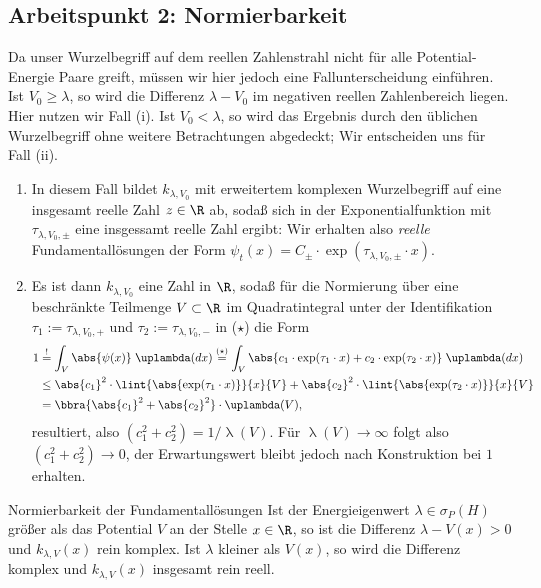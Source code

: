 \documentclass{subfiles}
\begin{document}
    \subsection{Arbeitspunkt 2: Normierbarkeit}
        Da unser Wurzelbegriff auf dem reellen Zahlenstrahl nicht für alle Potential-Energie Paare greift, müssen wir hier jedoch eine Fallunterscheidung einführen. Ist $V_0\geq \lambda$, so wird die Differenz $\lambda - V_0$ im negativen reellen Zahlenbereich liegen. Hier nutzen wir Fall (i). Ist $V_0 < \lambda$, so wird das Ergebnis durch den üblichen Wurzelbegriff ohne weitere Betrachtungen abgedeckt; Wir entscheiden uns für Fall (ii). 
        \begin{enumerate}[label=(\roman*)]
            \item In diesem Fall bildet $k_{\lambda,V_0}$ mit erweitertem komplexen Wurzelbegriff auf eine insgesamt reelle Zahl $z\in\R$ ab, sodaß sich in der Exponentialfunktion mit $\tau_{\lambda,V_0,\pm}$ eine insgessamt reelle Zahl ergibt: Wir erhalten also \emph{reelle} Fundamentallösungen der Form $\psi_t(x) = C_\pm\cdot\exp(\tau_{\lambda,V_0,\pm}\cdot x)$.
            \item Es ist dann $k_{\lambda,V_0}$ eine Zahl in $\R$, sodaß für die Normierung über eine beschränkte Teilmenge $V\subset\R$ im Quadratintegral unter der Identifikation $\tau_1 := \tau_{\lambda,V_0,+}$ und $\tau_2 := \tau_{\lambda,V_0,-}$ in ($\star$) die Form
            \begin{align*}
                1 &\stackrel{!}{=} \int_V\abs{\psi(x)}\;\uplambda(dx) \stackrel{(\star)}{=} \int_V\abs{c_1\cdot\exp(\tau_1\cdot x) + c_2\cdot\exp(\tau_2\cdot x)}\;\uplambda(dx)\\
                &\leq \abs{c_1}^2\cdot\lint{\abs{\exp(\tau_1\cdot x)}}{x}{V} + \abs{c_2}^2\cdot\lint{\abs{\exp(\tau_2\cdot x)}}{x}{V} \\
                &= \bbra{\abs{c_1}^2 + \abs{c_2}^2}\cdot \uplambda(V),
            \end{align*}
            resultiert, also $(c_1^2 + c_2^2) = 1/\uplambda(V)$. Für $\uplambda(V)\to\infty$ folgt also $(c_1^2 + c_2^2)\to 0$, der Erwartungswert bleibt jedoch nach Konstruktion bei $1$ erhalten. 
        \end{enumerate}
        \begin{mcor}{Normierbarkeit der Fundamentallösungen}
            Ist der Energieigenwert $\lambda\in\sigma_P(H)$ größer als das Potential $V$ an der Stelle $x\in\R$, so ist die Differenz $\lambda - V(x)>0$ und $k_{\lambda,V}(x)$ rein komplex. Ist $\lambda$ kleiner als $V(x)$, so wird die Differenz komplex und $k_{\lambda,V}(x)$ insgesamt rein reell.
        \end{mcor}
\end{document}
